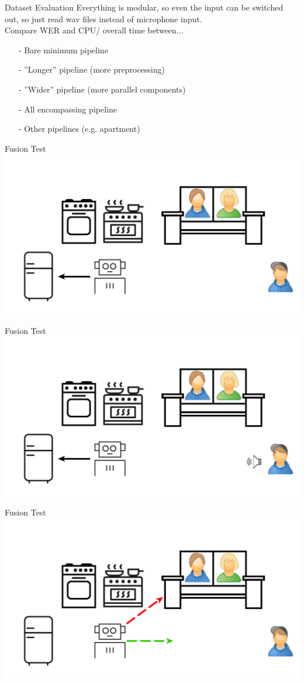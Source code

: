 \documentclass{beamer}
\begin{document}
	\begin{frame}{Dataset Evaluation}
		Everything is modular, so even the input can be switched out, so just read wav files instead of microphone input.\\

		Compare WER and CPU/ overall time between...
		\begin{itemize}
			\item[-] Bare minimum pipeline
			\item[-] ''Longer'' pipeline (more preprocessing)
			\item[-] ''Wider'' pipeline (more parallel components)
			\item[-] All encompassing pipeline
			\item[-] Other pipelines (e.g. apartment)
		\end{itemize}
	\end{frame}
	
	\begin{frame}{Fusion Test}
		\centering
		\includegraphics[width=.75\textwidth]{Bilder/fusion_test_0}
	\end{frame}
	
	\begin{frame}{Fusion Test}
		\centering
		\includegraphics[width=.75\textwidth]{Bilder/fusion_test_1}
	\end{frame}
	
	\begin{frame}{Fusion Test}
		\centering
		\includegraphics[width=.75\textwidth]{Bilder/fusion_test_2}
	\end{frame}
	
\end{document}
